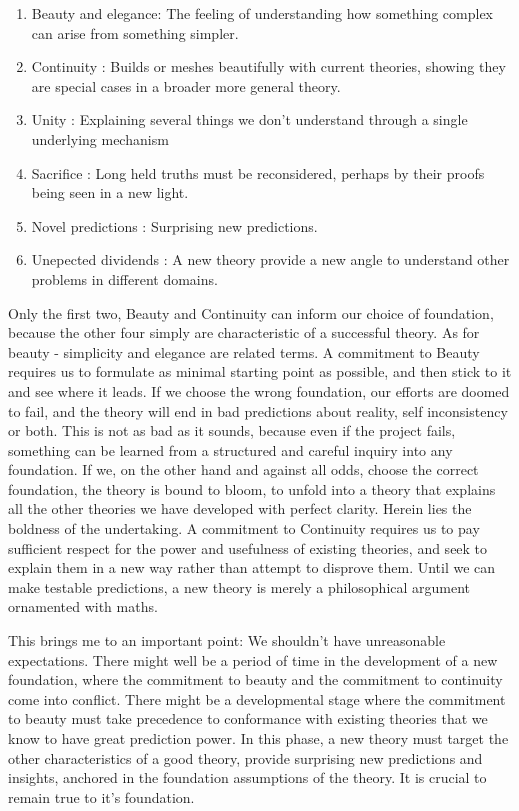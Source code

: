 \documentclass[notitlepage]{report}
\begin{document}
\begin{enumerate}
	\item  Beauty and elegance: The feeling of understanding how something complex can arise from something simpler.
		\item  Continuity : Builds or meshes beautifully with current theories, showing they are special cases in a broader more general theory.
	\item  Unity : Explaining several things we don't understand through a single underlying mechanism
	\item  Sacrifice : Long held truths must be reconsidered, perhaps by their proofs being seen in a new light.
	\item Novel predictions : Surprising new predictions.
	\item Unepected dividends : A new theory provide a new angle to understand other problems in different domains.
\end{enumerate}

Only the first two, Beauty and Continuity can inform our choice of foundation, because the other four simply are characteristic of a successful theory. As for beauty - simplicity and elegance are related terms. A commitment to Beauty requires us to formulate as minimal starting point as possible, and then stick to it and see where it leads. If we choose the wrong foundation, our efforts are doomed to fail, and the theory will end in bad predictions about reality, self inconsistency or both. This is not as bad as it sounds, because even if the project fails, something can be learned from a structured and careful inquiry into any foundation. If we, on the other hand and against all odds, choose the correct foundation, the theory is bound to bloom, to unfold into a theory that explains all the other theories we have developed with perfect clarity. Herein lies the boldness of the undertaking. A commitment to Continuity requires us to pay sufficient respect for the power and usefulness of existing theories, and seek to explain them in a new way rather than attempt to disprove them. Until we can make testable predictions, a new theory is merely a philosophical argument ornamented with maths. 

This brings me to an important point: We shouldn't have unreasonable expectations. There might well be a period of time in the development of a new foundation, where the commitment to beauty and the commitment to continuity come into conflict. There might be a developmental stage where the commitment to beauty must take precedence to conformance with existing theories that we know to have great prediction power. In this phase, a new theory must target the other characteristics of a good theory, provide surprising new predictions and insights, anchored in the foundation assumptions of the theory. It is crucial to remain true to it's foundation.
\end{document}
